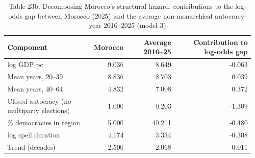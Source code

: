 \begin{table}
\caption{Table 23b. Decomposing Morocco's structural hazard: contributions to the log-odds gap between Morocco (2025) and the average non-monarchical autocracy-year 2016–2025 (model 3)}
\label{tab:T23b_hazard_decomposition}
\begin{tabular}{lrrr}
\toprule
Component & Morocco & Average 2016–25 & Contribution to log-odds gap \\
\midrule
log GDP pc & 9.036 & 8.649 & -0.063 \\
Mean years, 20–39 & 8.836 & 8.703 & 0.039 \\
Mean years, 40–64 & 4.832 & 7.008 & 0.372 \\
Closed autocracy (no multiparty elections) & 1.000 & 0.203 & -1.309 \\
\% democracies in region & 5.000 & 40.211 & -0.480 \\
log spell duration & 4.174 & 3.334 & -0.308 \\
Trend (decades) & 2.500 & 2.068 & 0.011 \\
\bottomrule
\end{tabular}
\end{table}

